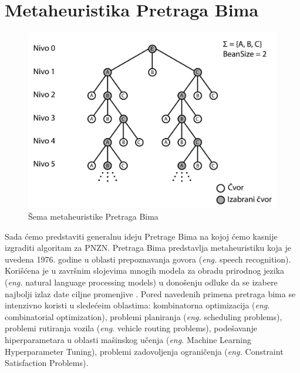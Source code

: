 \documentclass[12pt,oneside]{memoir}
\begin{document}
\section{Metaheuristika Pretraga Bima}
\begin{figure}[!ht]
  \centering
  \includegraphics[width=1\textwidth]{Slike/bs2.png}
  \caption{Šema metaheuristike Pretraga Bima} 
  \label{fig:pretragaBima}
\end{figure}
Sada ćemo predstaviti generalnu ideju Pretrage Bima na kojoj ćemo kasnije izgraditi algoritam za PNZN.
Pretraga Bima predstavlja metaheuristiku koja je uvedena 1976. godine u oblasti prepoznavanja govora
(\textit{eng.} speech recognition). Korišćena je u završnim slojevima mnogih modela za
obradu prirodnog jezika (\textit{eng.} natural language processing models) u donošenju odluke da se izabere najbolji
izlaz date ciljne promenjive \cite{BSIntroduction}. Pored navedenih primena pretraga bima se intenzivno koristi u sledećeim
oblastima: kombinatorna optimizacija (\textit{eng.} combinatorial optimization), problemi planiranja (\textit{eng.} scheduling problems),
problemi rutiranja vozila (\textit{eng.} vehicle routing problems), podešavanje hiperparametara u oblasti mašinskog učenja
(\textit{eng.} Machine Learning Hyperparameter Tuning), problemi zadovoljenja ograničenja (\textit{eng.} Constraint Satisfaction Problems). 
\end{document}

